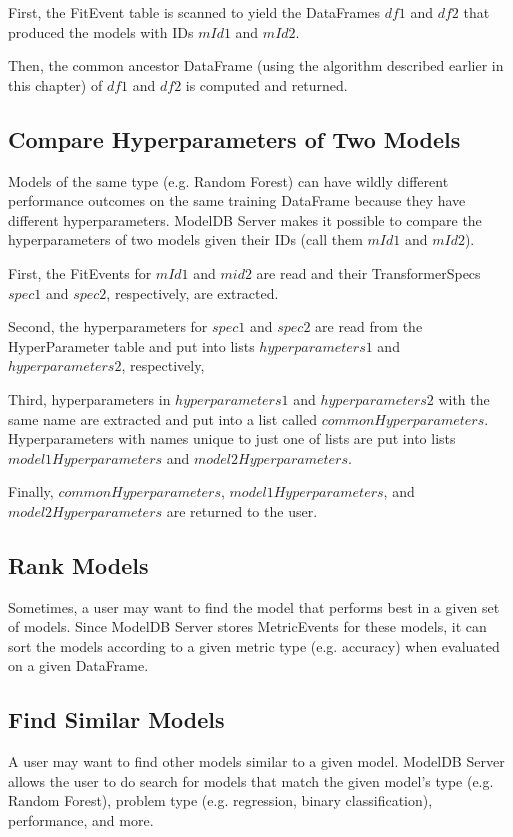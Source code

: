 First, the FitEvent table is scanned to yield the DataFrames $df1$ and $df2$
that produced the models with IDs $mId1$ and $mId2$.

Then, the common ancestor DataFrame (using the algorithm described earlier in
this chapter) of $df1$ and $df2$ is computed and returned.

\subsection{Compare Hyperparameters of Two Models}
Models of the same type (e.g. Random Forest) can have wildly different performance
outcomes on the same training DataFrame because they have different hyperparameters.
ModelDB Server makes it possible to compare the hyperparameters of two models given their
IDs (call them $mId1$ and $mId2$).

First, the FitEvents for $mId1$ and $mid2$ are read and their TransformerSpecs $spec1$ and
$spec2$, respectively, are extracted.

Second, the hyperparameters for $spec1$ and $spec2$ are read from the HyperParameter table
and put into lists $hyperparameters1$ and $hyperparameters2$, respectively,

Third, hyperparameters in $hyperparameters1$ and $hyperparameters2$ with the same name are
extracted and put into a list called $commonHyperparameters$. Hyperparameters with names unique to just
one of lists are put into lists $model1Hyperparameters$ and $model2Hyperparameters$.

Finally, $commonHyperparameters$, $model1Hyperparameters$, and $model2Hyperparameters$ are
returned to the user.

\subsection{Rank Models}
Sometimes, a user may want to find the model that performs best in a given set of
models. Since ModelDB Server stores MetricEvents for these models, it can sort the models
according to a given metric type (e.g. accuracy) when evaluated on a given DataFrame.

\subsection{Find Similar Models}
A user may want to find other models similar to a given model. ModelDB Server
allows the user to do search for models that match the given model's type (e.g. 
Random Forest), problem type (e.g. regression, binary classification), performance,
and more.

